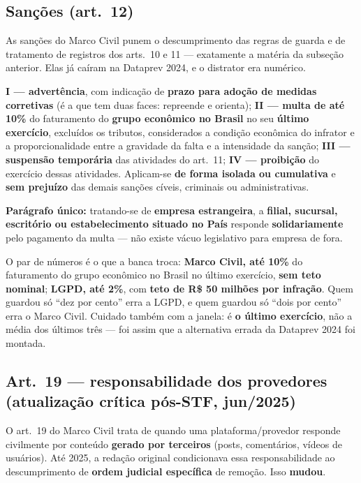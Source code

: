 \subsection{Sanções (art.\ 12)}

As sanções do Marco Civil punem o descumprimento das regras de guarda e de
tratamento de registros dos arts.\ 10 e 11 --- exatamente a matéria da
subseção anterior. Elas já caíram na Dataprev 2024, e o distrator era
numérico.

\begin{conceito}
\textbf{I --- advertência}, com indicação de \textbf{prazo para adoção de
medidas corretivas} (é a que tem duas faces: repreende e orienta);
\textbf{II --- multa de até 10\%} do faturamento do \textbf{grupo econômico no
Brasil} no seu \textbf{último exercício}, excluídos os tributos, considerados
a condição econômica do infrator e a proporcionalidade entre a gravidade da
falta e a intensidade da sanção; \textbf{III --- suspensão temporária} das
atividades do art.\ 11; \textbf{IV --- proibição} do exercício dessas
atividades. Aplicam-se \textbf{de forma isolada ou cumulativa} e
\textbf{sem prejuízo} das demais sanções cíveis, criminais ou
administrativas.

\textbf{Parágrafo único:} tratando-se de \textbf{empresa estrangeira}, a
\textbf{filial, sucursal, escritório ou estabelecimento situado no País}
responde \textbf{solidariamente} pelo pagamento da multa --- não existe vácuo
legislativo para empresa de fora.
\end{conceito}

O par de números é o que a banca troca: \textbf{Marco Civil, até 10\%} do
faturamento do grupo econômico no Brasil no último exercício, \textbf{sem teto
nominal}; \textbf{LGPD, até 2\%}, com \textbf{teto de R\$ 50 milhões por
infração}. Quem guardou só ``dez por cento'' erra a LGPD, e quem guardou só
``dois por cento'' erra o Marco Civil. Cuidado também com a janela: é
\textbf{o último exercício}, não a média dos últimos três --- foi assim que a
alternativa errada da Dataprev 2024 foi montada.

\subsection{Art.\ 19 --- responsabilidade dos provedores (atualização crítica pós-STF, jun/2025)}

O art.\ 19 do Marco Civil trata de quando uma plataforma/provedor responde
civilmente por conteúdo \textbf{gerado por terceiros} (posts, comentários,
vídeos de usuários). Até 2025, a redação original condicionava essa
responsabilidade ao descumprimento de \textbf{ordem judicial específica} de
remoção. Isso \textbf{mudou}.

